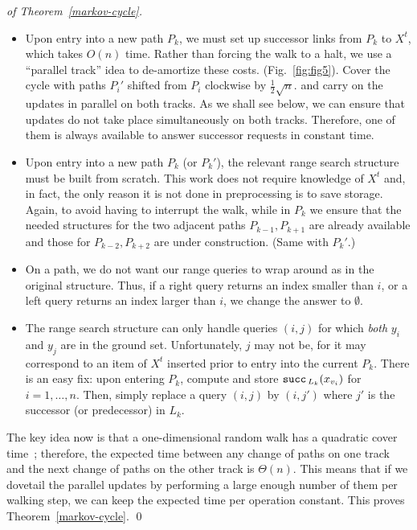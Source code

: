 \documentclass[oribibl,envcountsect,envcountsame]{llncs}
\begin{document}
\begin{proof}[of Theorem~\ref{markov-cycle}]
\begin{itemize}
\item
Upon entry into a new path $P_k$, we must set up 
successor links from $P_k$ to $X^t$, which takes $O(n)$ time.
Rather than forcing the walk to a halt, we use a ``parallel track'' idea
to de-amortize these costs. (Fig.~\ref{fig:fig5}).
Cover the cycle with paths $P_i'$ shifted from
$P_i$ clockwise by $\frac{1}{2}\sqrt{n}$.
and carry on the updates in parallel on both tracks.
As we shall see below, we can ensure that
updates do not take place simultaneously on both tracks.
Therefore, one of them is always
available to answer successor requests in constant time.
\item
Upon entry into a new path $P_k$ (or $P_k'$),
the relevant range search structure must be built from scratch.
This work does not require knowledge of $X^t$
and, in fact, the only reason
it is not done in preprocessing is to save storage.
Again, to avoid having to interrupt the walk,
while in $P_k$ we ensure that the needed
structures for the two adjacent paths $P_{k-1},P_{k+1}$ are already available
and those for $P_{k-2},P_{k+2}$ are under construction.
(Same with $P_k'$.) 
\item
On a path, we do not want our range queries to wrap around as 
in the original structure. Thus, if a right query returns an index
smaller than $i$, or a left query returns an index larger than $i$,
we change the answer to $\emptyset$.
\item
The range search structure can only handle queries $(i,j)$ for which
{\em both} $y_i$ and $y_j$ are in the ground set. Unfortunately, $j$ may not be,
for it may correspond to an item of $X^t$ inserted prior
to entry into the current $P_k$.
There is an easy fix: upon entering $P_k$, compute and store
${\tt succ}_{\,L_k}(x_{v_i})$ for $i=1,\ldots, n$.
Then, simply replace a query $(i,j)$ by $(i,j')$ where $j'$
is the successor (or predecessor) in $L_k$.
\end{itemize}

The key idea now is that a one-dimensional random walk has 
a quadratic cover time~\cite{MotwaniRa95};
therefore, the expected
time between any change of paths on one track and
the next change of paths on the other track is $\Theta(n)$.
This means that if we dovetail the parallel updates by
performing a large enough number of them per walking step,
we can keep the expected time per operation constant.
This proves Theorem~\ref{markov-cycle}.
\qed\end{proof}
\end{document}

